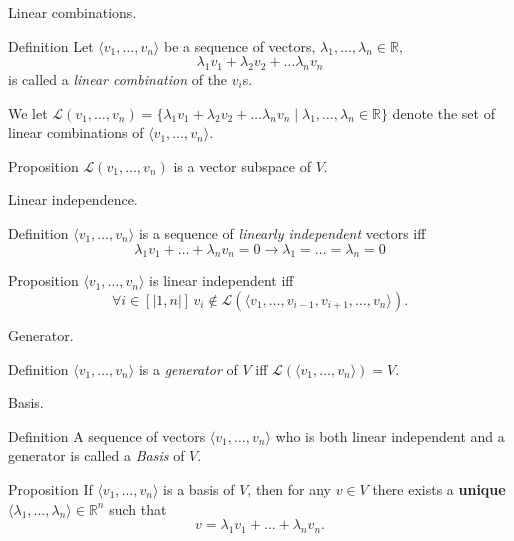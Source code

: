 \documentclass{beamer}
\begin{document}
\begin{frame}{Linear combinations.}
  \begin{block}{Definition}
    Let $\langle v_1, \dots, v_n \rangle$ be a sequence of vectors, $\lambda_1, \dots, \lambda_n \in \mathbb{R}$,
    \[\lambda_1 v_1 + \lambda_2 v_2 + \dots \lambda_n v_n\] is called a \emph{linear combination} of the $v_i$s.

   We let $\mathcal{L}(v_1, \dots, v_n) = \{ \lambda_1 v_1 + \lambda_2 v_2 + \dots \lambda_n v_n \mid \lambda_1, \dots, \lambda_n \in \mathbb{R}\}$ denote the set of linear combinations of $\langle v_1, \dots, v_n \rangle$.
  \end{block}

  \begin{block}{Proposition}
     $\mathcal{L}(v_1, \dots, v_n)$ is a vector subspace of $V$.
  \end{block}
    
\end{frame}

\begin{frame}{Linear independence.}
  \begin{block}{Definition}
    $\langle v_1, \dots, v_n \rangle$ is a sequence of \emph{linearly independent} vectors iff
    \[\lambda_1 v_1 + \dots + \lambda_n v_n = 0 \rightarrow \lambda_1 = \dots = \lambda_n = 0  \]
  \end{block}

  \begin{block}{Proposition}
    $\langle v_1, \dots, v_n \rangle$ is linear independent iff \[\forall i \in [|1, n|]\, v_i \notin \mathcal{L}(\langle v_1, \dots, v_{i-1}, v_{i+1}, \dots, v_n \rangle).\]
  \end{block}
\end{frame}

\begin{frame}{Generator.}
  \begin{block}{Definition}
    $\langle v_1, \dots, v_n \rangle$ is a \emph{generator} of $V$ iff $\mathcal{L}(\langle v_1, \dots, v_n \rangle) = V$.
  \end{block}
\end{frame}

\begin{frame}{Basis.}
  \begin{block}{Definition}
    A sequence of vectors $\langle v_1, \dots, v_n \rangle$ who is both linear independent and a generator is called a \emph{Basis} of $V$.
  \end{block}

  \begin{block}{Proposition}
    If $\langle v_1, \dots, v_n \rangle$ is a basis of $V$, then for any $v \in V$ there exists a {\bf unique} $\langle \lambda_1, \dots, \lambda_n \rangle \in \mathbb{R}^n$ such that
    \[ v = \lambda_1v_1 + \dots + \lambda_n v_n. \]
  \end{block}

\end{frame}
\end{document}
